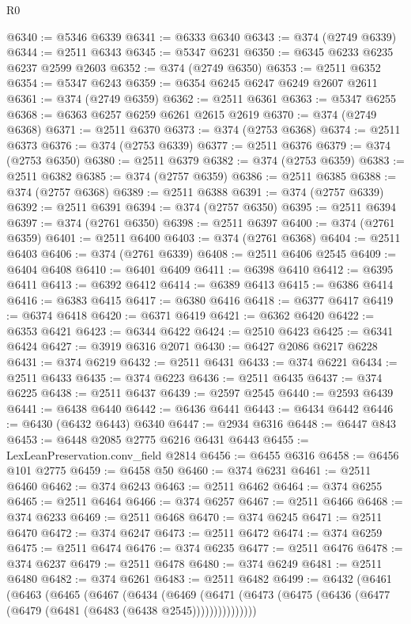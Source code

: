 \begin{lexlean}{R0}
\begin{coremodule}
@6340 := @5346 @6339
@6341 := @6333 @6340
@6343 := @374 (@2749 @6339)
@6344 := @2511 @6343
@6345 := @5347 @6231
@6350 := @6345 @6233 @6235 @6237 @2599 @2603
@6352 := @374 (@2749 @6350)
@6353 := @2511 @6352
@6354 := @5347 @6243
@6359 := @6354 @6245 @6247 @6249 @2607 @2611
@6361 := @374 (@2749 @6359)
@6362 := @2511 @6361
@6363 := @5347 @6255
@6368 := @6363 @6257 @6259 @6261 @2615 @2619
@6370 := @374 (@2749 @6368)
@6371 := @2511 @6370
@6373 := @374 (@2753 @6368)
@6374 := @2511 @6373
@6376 := @374 (@2753 @6339)
@6377 := @2511 @6376
@6379 := @374 (@2753 @6350)
@6380 := @2511 @6379
@6382 := @374 (@2753 @6359)
@6383 := @2511 @6382
@6385 := @374 (@2757 @6359)
@6386 := @2511 @6385
@6388 := @374 (@2757 @6368)
@6389 := @2511 @6388
@6391 := @374 (@2757 @6339)
@6392 := @2511 @6391
@6394 := @374 (@2757 @6350)
@6395 := @2511 @6394
@6397 := @374 (@2761 @6350)
@6398 := @2511 @6397
@6400 := @374 (@2761 @6359)
@6401 := @2511 @6400
@6403 := @374 (@2761 @6368)
@6404 := @2511 @6403
@6406 := @374 (@2761 @6339)
@6408 := @2511 @6406 @2545
@6409 := @6404 @6408
@6410 := @6401 @6409
@6411 := @6398 @6410
@6412 := @6395 @6411
@6413 := @6392 @6412
@6414 := @6389 @6413
@6415 := @6386 @6414
@6416 := @6383 @6415
@6417 := @6380 @6416
@6418 := @6377 @6417
@6419 := @6374 @6418
@6420 := @6371 @6419
@6421 := @6362 @6420
@6422 := @6353 @6421
@6423 := @6344 @6422
@6424 := @2510 @6423
@6425 := @6341 @6424
@6427 := @3919 @6316 @2071
@6430 := @6427 @2086 @6217 @6228
@6431 := @374 @6219
@6432 := @2511 @6431
@6433 := @374 @6221
@6434 := @2511 @6433
@6435 := @374 @6223
@6436 := @2511 @6435
@6437 := @374 @6225
@6438 := @2511 @6437
@6439 := @2597 @2545
@6440 := @2593 @6439
@6441 := @6438 @6440
@6442 := @6436 @6441
@6443 := @6434 @6442
@6446 := @6430 (@6432 @6443) @6340
@6447 := @2934 @6316
@6448 := @6447 @843
@6453 := @6448 @2085 @2775 @6216 @6431 @6443
@6455 := LexLeanPreservation.conv_field @2814
@6456 := @6455 @6316
@6458 := @6456 @101 @2775
@6459 := @6458 @50
@6460 := @374 @6231
@6461 := @2511 @6460
@6462 := @374 @6243
@6463 := @2511 @6462
@6464 := @374 @6255
@6465 := @2511 @6464
@6466 := @374 @6257
@6467 := @2511 @6466
@6468 := @374 @6233
@6469 := @2511 @6468
@6470 := @374 @6245
@6471 := @2511 @6470
@6472 := @374 @6247
@6473 := @2511 @6472
@6474 := @374 @6259
@6475 := @2511 @6474
@6476 := @374 @6235
@6477 := @2511 @6476
@6478 := @374 @6237
@6479 := @2511 @6478
@6480 := @374 @6249
@6481 := @2511 @6480
@6482 := @374 @6261
@6483 := @2511 @6482
@6499 := @6432
    (@6461
      (@6463
        (@6465
          (@6467
            (@6434
              (@6469
                (@6471 (@6473 (@6475 (@6436 (@6477 (@6479 (@6481 (@6483 (@6438 @2545)))))))))))))))

\end{coremodule}
\end{lexlean}
